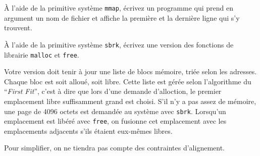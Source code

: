 \question

À l'aide de la primitive système \texttt {mmap}, écrivez un programme
qui prend en argument un nom de fichier et affiche la première et la
dernière ligne qui s'y trouvent.


\question

\`A l'aide de la primitive système {\tt sbrk}, écrivez une version
des fonctions de librairie {\tt malloc} et {\tt free}.

Votre version doit tenir à jour une liste de blocs mémoire, triée
selon les adresses. Chaque bloc
est soit alloué, soit libre. Cette liste est gérée selon l'algorithme
du ``{\em First Fit\/}'', c'est à dire que lors d'une demande
d'alloction, le premier emplacement libre suffisamment grand est
choisi. S'il n'y a pas assez de mémoire, une page de 4096 octets
est demandée au système avec {\tt sbrk}. Lorsqu'un emplacement est
libéré avec {\tt free}, on fusionne cet emplacement avec les
emplacements adjacents s'ils étaient eux-mêmes libres.

Pour simplifier, on ne tiendra pas compte des contraintes
d'alignement.
